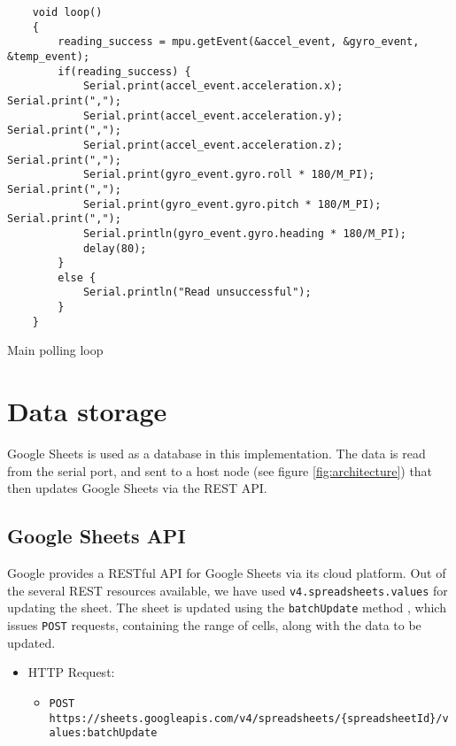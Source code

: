 \documentclass[./RTPostureTrackingReport.tex]{subfiles}
\begin{document}
\begin{code}
    \begin{verbatim}
    void loop()
    {
        reading_success = mpu.getEvent(&accel_event, &gyro_event, &temp_event);
        if(reading_success) {
            Serial.print(accel_event.acceleration.x); Serial.print(",");
            Serial.print(accel_event.acceleration.y); Serial.print(",");
            Serial.print(accel_event.acceleration.z); Serial.print(",");
            Serial.print(gyro_event.gyro.roll * 180/M_PI); Serial.print(",");
            Serial.print(gyro_event.gyro.pitch * 180/M_PI); Serial.print(",");
            Serial.println(gyro_event.gyro.heading * 180/M_PI);
            delay(80);
        }
        else {
            Serial.println("Read unsuccessful");
        }
    }
    \end{verbatim}
    \caption{Main polling loop}
    \label{code:ucloop}
\end{code}
\vspace{0.5cm}

\section{Data storage}\label{sec:implstr}
Google Sheets is used as a database in this implementation. The data is read
from the serial port, and sent to a host node (see figure
\ref{fig:architecture}) that then updates Google Sheets via the REST API.

\subsection{Google Sheets API}
Google provides a RESTful API for Google Sheets via its cloud platform. Out of
the several REST resources available, we have used
\texttt{v4.spreadsheets.values} for updating the sheet. The sheet is
updated using the \texttt{batchUpdate} method \cite{gsheetapi}, which issues
\texttt{POST} requests, containing the range of cells, along with the
data to be updated.

\begin{itemize}
    \item HTTP Request:
        \begin{itemize}
            \item {\small \texttt{POST https://sheets.googleapis.com/v4/spreadsheets/\{spreadsheetId\}/values:batchUpdate}}
        \end{itemize}
\end{itemize}
\end{document}
